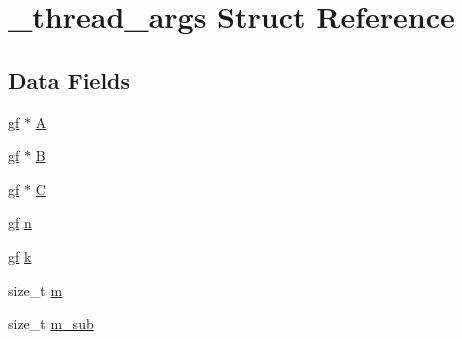 \hypertarget{struct__thread__args}{\section{\-\_\-thread\-\_\-args \-Struct \-Reference}
\label{struct__thread__args}
}
\subsection*{\-Data \-Fields}
\begin{DoxyCompactItemize}
\item 
\hyperlink{gf_8h_a339b4ec591f7b3fed03e4be7c9482508}{gf} $\ast$ \hyperlink{struct__thread__args_ac2bc1796e6d1732c9e3dcb348c60ae66}{\-A}
\item 
\hyperlink{gf_8h_a339b4ec591f7b3fed03e4be7c9482508}{gf} $\ast$ \hyperlink{struct__thread__args_ae3dda90908019f0489093d20f1853d91}{\-B}
\item 
\hyperlink{gf_8h_a339b4ec591f7b3fed03e4be7c9482508}{gf} $\ast$ \hyperlink{struct__thread__args_a8f458932b20d9d1157f971db8f98164b}{\-C}
\item 
\hyperlink{gf_8h_a339b4ec591f7b3fed03e4be7c9482508}{gf} \hyperlink{struct__thread__args_a9e0748e3b178eca9ec3f38f7413ce1d6}{n}
\item 
\hyperlink{gf_8h_a339b4ec591f7b3fed03e4be7c9482508}{gf} \hyperlink{struct__thread__args_aec2802121008082cd103234425abf1e1}{k}
\item 
size\-\_\-t \hyperlink{struct__thread__args_afe58b0bb244c97663f73298f2f33417a}{m}
\item 
size\-\_\-t \hyperlink{struct__thread__args_af7c9422c5325b8766a27b5038c0e9462}{m\-\_\-sub}
\end{DoxyCompactItemize}


